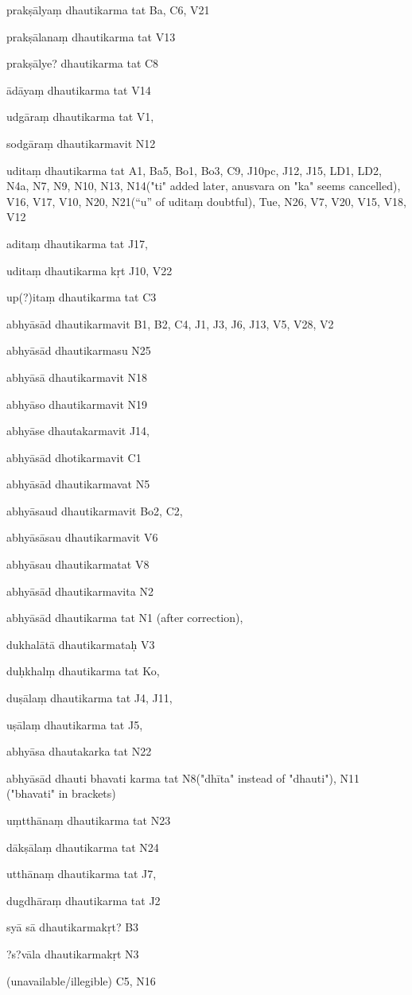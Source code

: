 \begin{ekdosis}
\begin{marma}[hp01_055]
\begin{marma}[hp02_009]
\begin{marma}[hp02_011]
\begin{marma}[hp02_24d]
\item[prakṣālyaṃ dhautikarma tat] Ba, C6, V21
\item[prakṣālanaṃ dhautikarma tat] V13
\item[prakṣālye? dhautikarma tat] C8
\item[ādāyaṃ dhautikarma tat] V14
\item[udgāraṃ dhautikarma tat] V1,
\item[sodgāraṃ dhautikarmavit] N12
\item[uditaṃ dhautikarma tat] A1, Ba5, Bo1, Bo3, C9, J10pc, J12, J15, LD1, LD2, N4a, N7, N9, N10, N13, N14("ti" added later, anusvara on "ka" seems cancelled), V16, V17, V10, N20, N21(“u” of uditaṃ doubtful), Tue, N26, V7, V20, V15, V18, V12
\item[aditaṃ dhautikarma tat] J17,
\item[uditaṃ dhautikarma kṛt] J10, V22
\item[up(?)itaṃ dhautikarma tat] C3
\item[abhyāsād dhautikarmavit] B1, B2, C4, J1, J3, J6, J13, V5, V28, V2
\item[abhyāsād dhautikarmasu] N25
\item[abhyāsā dhautikarmavit] N18
\item[abhyāso dhautikarmavit] N19
\item[abhyāse dhautakarmavit] J14,
\item[abhyāsād dhotikarmavit] C1
\item[abhyāsād dhautikarmavat] N5
\item[abhyāsaud dhautikarmavit] Bo2, C2,
\item[abhyāsāsau dhautikarmavit] V6
\item[abhyāsau dhautikarmatat] V8
\item[abhyāsād dhautikarmavita] N2
\item[abhyāsād dhautikarma tat] N1 (after correction),
\item[dukhalātā dhautikarmataḥ] V3
\item[duḥkhalṃ dhautikarma tat] Ko,
\item[duṣālaṃ dhautikarma tat] J4, J11, 
\item[uṣālaṃ dhautikarma tat] J5,
\item[abhyāsa dhautakarka tat] N22
\item[abhyāsād dhauti bhavati karma tat] N8("dhīta" instead of "dhauti"), N11 ("bhavati" in brackets)
\item[uṃtthānaṃ dhautikarma tat] N23
\item[dākṣālaṃ dhautikarma tat] N24
\item[utthānaṃ dhautikarma tat] J7,
\item[dugdhāraṃ dhautikarma tat] J2
\item[syā sā dhautikarmakṛt?] B3
\item[?s?vāla dhautikarmakṛt] N3
\item[(unavailable/illegible)] C5, N16
 \begin{description}


\end{description}
\end{marma}
\end{marma}
\end{marma}
\end{marma}
\end{ekdosis}
